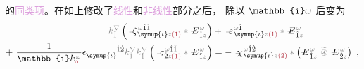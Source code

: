 的\textcolor{Plum}{同类项}。在如上修改了\textcolor{Plum}{线性}和\textcolor{Plum}{非线性}部分之后， 除以 $\mathbb{i} \mathcolor{gray}{\omega}$ 后变为
\begin{subequations}
\begin{align}
	\mathcolor{gray}{k^\nabla_{\check{1}}} \left( \Xint{\begin{smallmatrix} ~ \\ {}^{}_{\mathcolor{gray}{-}} \\ ~ \end{smallmatrix}}{12}{\zeta}^{\;\! \mathcolor{gray}{\omega} \hat{1} \mathcolor{gray}{\check{1}}}_{\;\! \symup{\iota} \mathcolor{gray}{z} \textcolor{Maroon}{(1)}} \mathcolor{gray}{*} \Xint{\mathcolor{gray}{-}}{295}{E}^{\;\!\mathcolor{gray}{\omega}}_{\;\! \hat{1} \mathcolor{gray}{z}} \right) &+ \Xint{\begin{smallmatrix} ~ \\ {}^{}_{\mathcolor{gray}{-}} \\ ~ \end{smallmatrix}}{16}{\varepsilon}^{\;\! \mathcolor{gray}{\omega} \hat{1}}_{\;\! \symup{\iota} \mathcolor{gray}{z} \textcolor{Maroon}{(1)}} \mathcolor{gray}{*} \Xint{\mathcolor{gray}{-}}{295}{E}^{\;\!\mathcolor{gray}{\omega}}_{\;\! \hat{1} \mathcolor{gray}{z}}  \label{eq:nonlinear(2)-wave_wkrho-simplify1} \\ 
	+~ \frac{1}{\mathbb{i} k_{\textcolor{Maroon}{\mathsf{o}}}^{\;\! \mathcolor{gray}{\omega}}} \epsilon^{\hphantom{\symup{\iota}}\mathcolor{gray}{\dot{1}}\dot{2}}_{\symup{\iota}} \mathcolor{gray}{k^\nabla_{\dot{1}}} \mathcolor{gray}{k^\nabla_{\check{1}}} \left( \Xint{\begin{smallmatrix} ~ \\ {}^{}_{\mathcolor{gray}{-}} \\ ~ \end{smallmatrix}}{13}{\varsigma}^{\;\! \mathcolor{gray}{\omega} \hat{1} \mathcolor{gray}{\check{1}}}_{\;\! \dot{2} \mathcolor{gray}{z} \textcolor{Maroon}{(1)}} \mathcolor{gray}{*} \Xint{\mathcolor{gray}{-}}{295}{E}^{\;\!\mathcolor{gray}{\omega}}_{\;\! \hat{1} \mathcolor{gray}{z}} \right) &= - ~\Xint{{}^{}_{\mathcolor{gray}{-}}}{23}{\chi}^{\;\! \mathcolor{gray}{\omega} \hat{1} \hat{2}}_{\;\! \symup{\iota} \mathcolor{gray}{z} \textcolor{Maroon}{(2)}} \mathcolor{gray}{*} \left( \Xint{\mathcolor{gray}{-}}{295}{E}^{\;\!\mathcolor{gray}{\omega}}_{\;\! \hat{1} \mathcolor{gray}{z}} ~\mathcolor{gray}{\widetilde \circledast}~ \Xint{\mathcolor{gray}{-}}{295}{E}^{\;\!\mathcolor{gray}{\omega}}_{\;\! \hat{2} \mathcolor{gray}{z}} \right)~, \label{eq:nonlinear(2)-wave_wkrho-simplify1-2}
\end{align}
\end{subequations}
